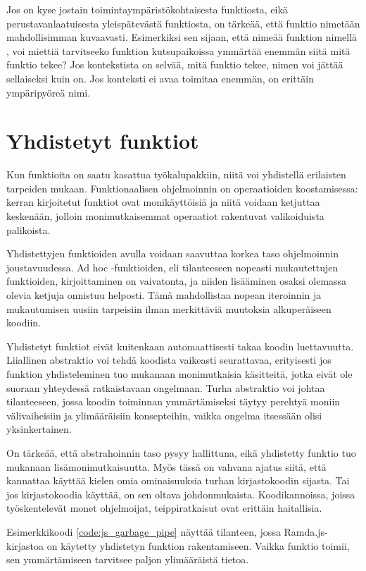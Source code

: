 Jos on kyse jostain toimintaympäristökohtaisesta funktiosta, eikä perustavanlaatuisesta yleispätevästä funktiosta, on tärkeää, että funktio nimetään mahdollisimman kuvaavasti. Esimerkiksi sen sijaan, että nimeää funktion nimellä , voi miettiä tarvitseeko funktion kutsupaikoissa ymmärtää enemmän siitä mitä funktio tekee? Jos kontekstista on selvää, mitä funktio tekee, nimen voi jättää sellaiseksi kuin on. Jos konteksti ei avaa toimitaa enemmän,  on erittäin ympäripyöreä nimi.

\section{Yhdistetyt funktiot}

Kun funktioita on saatu kasattua työkalupakkiin, niitä voi yhdistellä erilaisten tarpeiden mukaan. Funktionaalisen ohjelmoinnin on operaatioiden koostamisessa: kerran kirjoitetut funktiot ovat monikäyttöisiä ja niitä voidaan ketjuttaa keskenään, jolloin monimutkaisemmat operaatiot rakentuvat valikoiduista palikoista.

Yhdistettyjen funktioiden avulla voidaan saavuttaa korkea taso ohjelmoinnin joustavuudessa. Ad hoc -funktioiden, eli tilanteeseen nopeasti mukautettujen funktioiden, kirjoittaminen on vaivatonta, ja niiden lisääminen osaksi olemassa olevia ketjuja onnistuu helposti. Tämä mahdollistaa nopean iteroinnin ja mukautumisen uusiin tarpeisiin ilman merkittäviä muutoksia alkuperäiseen koodiin.

Yhdistetyt funktiot eivät kuitenkaan automaattisesti takaa koodin luettavuutta. Liiallinen abstraktio voi tehdä koodista vaikeasti seurattavaa, erityisesti jos funktion yhdisteleminen tuo mukanaan monimutkaisia käsitteitä, jotka eivät ole suoraan yhteydessä ratkaistavaan ongelmaan. Turha abstraktio voi johtaa tilanteeseen, jossa koodin toiminnan ymmärtämiseksi täytyy perehtyä moniin välivaiheisiin ja ylimääräisiin konsepteihin, vaikka ongelma itsessään olisi yksinkertainen.

On tärkeää, että abstrahoinnin taso pysyy hallittuna, eikä yhdistetty funktio tuo mukanaan lisämonimutkaisuutta. Myös tässä on vahvana ajatus siitä, että kannattaa käyttää kielen omia ominaisuuksia turhan kirjastokoodin sijasta. Tai jos kirjastokoodia käyttää, on sen oltava johdonmukaista. Koodikannoissa, joissa työskentelevät monet ohjelmoijat, teippiratkaisut ovat erittäin haitallisia.

Esimerkkikoodi \ref{code:js_garbage_pipe} näyttää tilanteen, jossa Ramda.js-kirjastoa on käytetty yhdistetyn funktion rakentamiseen. Vaikka funktio toimii, sen ymmärtämiseen tarvitsee paljon ylimääräistä tietoa.

